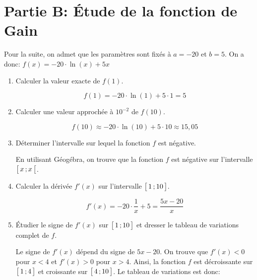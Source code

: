\documentclass[11pt, a4paper]{report}
\begin{document}
\section*{Partie B\@: Étude de la fonction de Gain}

Pour la suite, on admet que les paramètres sont fixés à $a = -20$ et $b = 5$. On a donc:
$f(x) = -20 \cdot \ln(x) + 5x$

\medskip

\begin{enumerate}[resume]
    \item Calculer la valeur exacte de $f(1)$.
    \begin{blocvisible}[height=1]
        \[f(1) = -20 \cdot \ln(1) + 5 \cdot 1 = 5\]
    \end{blocvisible}
    \item Calculer une valeur approchée à $10^{-2}$ de $f(10)$.
    \begin{blocvisible}[height=1]
        \[f(10) \approx -20 \cdot \ln(10) + 5 \cdot 10 \approx 15,05\]
    \end{blocvisible}
    \item Déterminer l'intervalle sur lequel la fonction $f$ est négative.
    \begin{blocvisible}[height=1]
        En utilisant Géogébra, on trouve que la fonction $f$ est négative sur l'intervalle $\bigl[ \, x \, ; x \,\bigl[$.
    \end{blocvisible}
    \item Calculer la dérivée $f'(x)$ sur l'intervalle $\bigl[ \, 1 \, ; 10 \,\bigl]$.
    \begin{blocvisible}[height=1.5]
\[f'(x) = -20 \cdot \frac{1}{x} + 5 = \dfrac{5x - 20}{x}\]
    \end{blocvisible}

        \pagebreak

    \item Étudier le signe de $f'(x)$ sur $\bigl[ \, 1 \, ; 10 \,\bigl]$ et dresser le tableau de variations complet de $f$.
    \begin{blocvisible}[height=4.5]
        \begin{minipage}{0.54\linewidth}
        Le signe de $f'(x)$ dépend du signe de $5x - 20$. On trouve que $f'(x) < 0$ pour $x < 4$ et $f'(x) > 0$ pour $x > 4$. Ainsi, la fonction $f$ est décroissante sur $\bigl[ \, 1 \, ; 4 \,\bigl]$ et croissante sur $\bigl[ \, 4 \, ; 10 \,\bigl]$. Le tableau de variations est donc:
        \end{minipage}\hfill
        \begin{minipage}{0.45\linewidth}
        \end{minipage}
    \end{blocvisible}
    
\end{enumerate}
    
\end{document}
